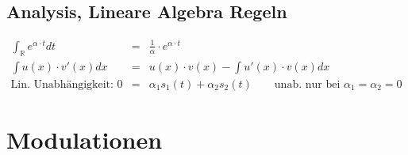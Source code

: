 \subsection{Analysis, Lineare Algebra Regeln}
 \begin{eqnarray*}
 \int_{\mathbb{R}} e^{\alpha \cdot t} dt &=& \frac{1}{\alpha} \cdot e^{\alpha \cdot t}\\
 \int u(x) \cdot v'(x) dx &=& u(x) \cdot v(x) - \int u'(x) \cdot v(x) dx \\
 \text{Lin. Unabhängigkeit: } 0 &=& \alpha_1 s_1(t) + \alpha_2 s_2(t) \qquad \text{unab. nur bei $\alpha_1 = \alpha_2 = 0$}
  \end{eqnarray*}

\vfill

\columnbreak

\section{Modulationen} 
